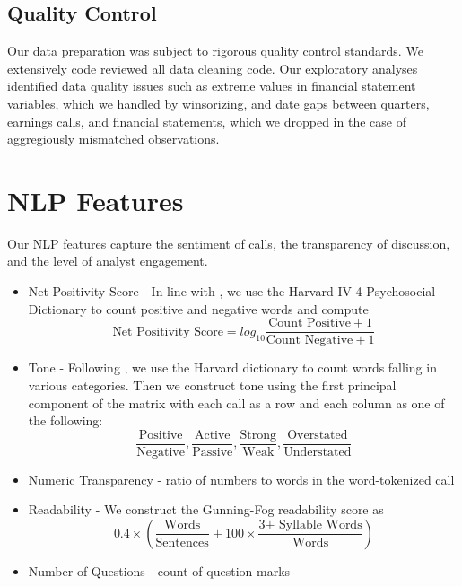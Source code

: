 \documentclass{article}[11pt]
\begin{document}
    \subsection*{Quality Control}

    Our data preparation was subject to rigorous quality control standards. We extensively code reviewed all data cleaning code. Our exploratory analyses identified data quality issues such as extreme values in financial statement variables, which we handled by winsorizing, and date gaps between quarters, earnings calls, and financial statements, which we dropped in the case of aggregiously mismatched observations.

    \section*{NLP Features}

    Our NLP features capture the sentiment of calls, the transparency of discussion, and the level of analyst engagement.

    \begin{itemize}
        \item Net Positivity Score - In line with \cite{kantos_comparative_2022}, we use the Harvard IV-4 Psychosocial Dictionary \cite{noauthor_inquirer_nodate} to count positive and negative words and compute
        \begin{equation*}
            \text{Net Positivity Score} = log_{10}\frac{\text{Count Positive} + 1}{\text{Count Negative} + 1}
        \end{equation*}
        \item Tone - Following \cite{price_earnings_2012}, we use the Harvard dictionary to count words falling in various categories. Then we construct tone using the first principal component of the matrix with each call as a row and each column as one of the following:
        \begin{equation*}
            \frac{\text{Positive}}{\text{Negative}}, \frac{\text{Active}}{\text{Passive}}, \frac{\text{Strong}}{\text{Weak}}, \frac{\text{Overstated}}{\text{Understated}}
        \end{equation*}
        \item Numeric Transparency - ratio of numbers to words in the word-tokenized call
        \item Readability - We construct the Gunning-Fog readability score \citep{gunning_technique_1952} as 
        \begin{equation*}
            0.4 \times (\frac{\text{Words}}{\text{Sentences}} + 100 \times \frac{\text{3+ Syllable Words}}{\text{Words}})
        \end{equation*}
        \item Number of Questions - count of question marks
    \end{itemize}
\end{document}
